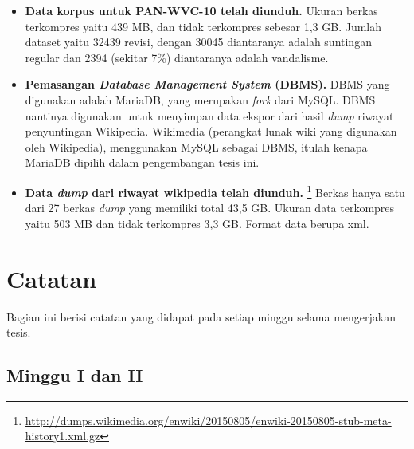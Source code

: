 \documentclass[12pt,a4paper,titlepage]{article}
\begin{document}
\begin{itemize}
	\item \textbf{Data korpus untuk PAN-WVC-10 telah diunduh.}
Ukuran berkas terkompres yaitu 439 MB, dan tidak terkompres sebesar 1,3 GB.
Jumlah dataset yaitu 32439 revisi, dengan 30045 diantaranya adalah suntingan regular dan 2394 (sekitar 7\%) diantaranya adalah vandalisme.

	\item \textbf{Pemasangan \textit{Database Management System} (DBMS).}
DBMS yang digunakan adalah MariaDB, yang merupakan \textit{fork} dari MySQL.
DBMS nantinya digunakan untuk menyimpan data ekspor dari hasil \textit{dump} riwayat penyuntingan Wikipedia.
Wikimedia (perangkat lunak wiki yang digunakan oleh Wikipedia), menggunakan MySQL sebagai DBMS, itulah kenapa MariaDB dipilih dalam pengembangan tesis ini.

	\item \textbf{Data \textit{dump} dari riwayat wikipedia telah diunduh.} \footnote{\RaggedRight\url{http://dumps.wikimedia.org/enwiki/20150805/enwiki-20150805-stub-meta-history1.xml.gz}}
Berkas hanya satu dari 27 berkas \textit{dump} yang memiliki total 43,5 GB.
Ukuran data terkompres yaitu 503 MB dan tidak terkompres 3,3 GB.
Format data berupa xml.
\end{itemize}

\newpage
\section{Catatan}

Bagian ini berisi catatan yang didapat pada setiap minggu selama mengerjakan tesis.

\subsection{Minggu I dan II}
\end{document}
